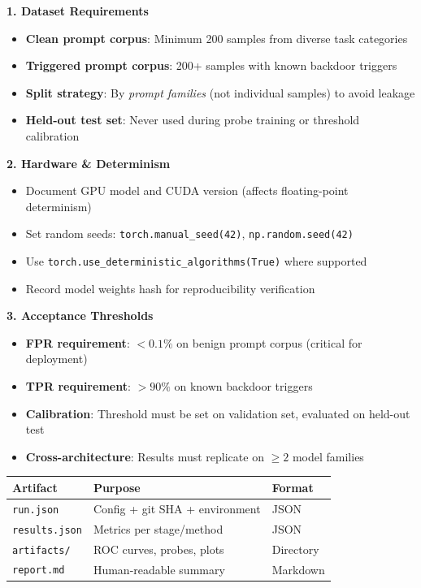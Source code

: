 \documentclass[11pt,letterpaper]{article}
\begin{document}
\begin{keyconceptbox}
\textbf{1. Dataset Requirements}
\begin{itemize}[nosep]
  \item \textbf{Clean prompt corpus}: Minimum 200 samples from diverse task categories
  \item \textbf{Triggered prompt corpus}: 200+ samples with known backdoor triggers
  \item \textbf{Split strategy}: By \textit{prompt families} (not individual samples) to avoid leakage
  \item \textbf{Held-out test set}: Never used during probe training or threshold calibration
\end{itemize}

\textbf{2. Hardware \& Determinism}
\begin{itemize}[nosep]
  \item Document GPU model and CUDA version (affects floating-point determinism)
  \item Set random seeds: \texttt{torch.manual\_seed(42)}, \texttt{np.random.seed(42)}
  \item Use \texttt{torch.use\_deterministic\_algorithms(True)} where supported
  \item Record model weights hash for reproducibility verification
\end{itemize}

\textbf{3. Acceptance Thresholds}
\begin{itemize}[nosep]
  \item \textbf{FPR requirement}: $< 0.1\%$ on benign prompt corpus (critical for deployment)
  \item \textbf{TPR requirement}: $> 90\%$ on known backdoor triggers
  \item \textbf{Calibration}: Threshold must be set on validation set, evaluated on held-out test
  \item \textbf{Cross-architecture}: Results must replicate on $\geq 2$ model families
\end{itemize}
\end{keyconceptbox}

\begin{center}
\begin{tabular}{lll}
\toprule
\textbf{Artifact} & \textbf{Purpose} & \textbf{Format} \\
\midrule
\rowcolor{backgroundgray} \texttt{run.json} & Config + git SHA + environment & JSON \\
\texttt{results.json} & Metrics per stage/method & JSON \\
\rowcolor{backgroundgray} \texttt{artifacts/} & ROC curves, probes, plots & Directory \\
\texttt{report.md} & Human-readable summary & Markdown \\
\bottomrule
\end{tabular}
\end{center}
\end{document}
